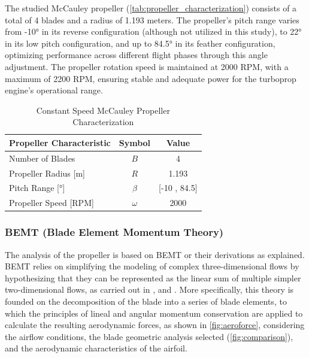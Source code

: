 \documentclass{Format}
\begin{document}
The studied McCauley propeller (\autoref{tab:propeller_characterization}) consists of a total of 4 blades and a radius of 1.193 meters.  The propeller's pitch range  varies from -10° in its reverse configuration (although not utilized in this study), to 22° in its low pitch configuration, and up to 84.5° in its feather configuration, optimizing performance across different flight phases through this angle adjustment. The propeller rotation speed is maintained at 2000 RPM, with a maximum of 2200 RPM, ensuring stable and adequate power for the turboprop engine's operational range.

\begin{table}[h!]
    \centering
    \begin{tabular}{|l|c|c|}
        \hline
        \textbf{Propeller Characteristic} & \textbf{Symbol} & \textbf{Value} \\
        \hline
        Number of Blades & $B$ & 4 \\
        Propeller Radius [m] & $R$ & 1.193 \\
        Pitch Range [°] & $\beta$ & [-10 , 84.5]\\
        Propeller Speed [RPM] & $\omega$ & 2000 \\
        \hline
    \end{tabular}
    \caption{Constant Speed McCauley Propeller Characterization}
    \label{tab:propeller_characterization}
\end{table}


\subsubsection{BEMT (Blade Element Momentum Theory)}

The analysis of the propeller is based on BEMT or their derivations as \cite{Chen1989NonuniformInflow} explained. BEMT relies on simplifying the modeling of complex three-dimensional flows by hypothesizing that they can be represented as the linear sum of multiple simpler two-dimensional flows, as carried out in \cite{Winarto2004BEMT}, \cite{Castellanos2023Propeller} and \cite{ning2021}. More specifically, this theory is founded on the decomposition of the blade into a series of blade elements, to which the principles of lineal and angular momentum conservation are applied to calculate the resulting aerodynamic forces, as shown in \autoref{fig:aeroforce}, considering the airflow conditions, the blade geometric analysis selected (\autoref{fig:comparison}), and the aerodynamic characteristics of the airfoil.
\end{document}
